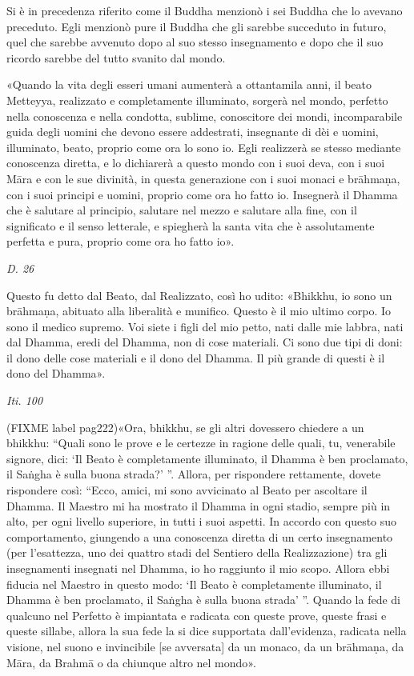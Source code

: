  Si è in precedenza riferito come il Buddha menzionò i
sei Buddha che lo avevano preceduto. Egli menzionò pure il Buddha che
gli sarebbe succeduto in futuro, quel che sarebbe avvenuto dopo al suo
stesso insegnamento e dopo che il suo ricordo sarebbe del tutto svanito
dal mondo.


 «Quando la vita degli esseri umani aumenterà a ottantamila
anni, il beato Metteyya, realizzato e completamente illuminato, sorgerà
nel mondo, perfetto nella conoscenza e nella condotta, sublime,
conoscitore dei mondi, incomparabile guida degli uomini che devono
essere addestrati, insegnante di dèi e uomini, illuminato, beato,
proprio come ora lo sono io. Egli realizzerà se stesso mediante
conoscenza diretta, e lo dichiarerà a questo mondo con i suoi deva, con
i suoi Māra e con le sue divinità, in questa generazione con i suoi
monaci e brāhmaṇa, con i suoi principi e uomini, proprio come ora ho
fatto io. Insegnerà il Dhamma che è salutare al principio, salutare nel
mezzo e salutare alla fine, con il significato e il senso letterale, e
spiegherà la santa vita che è assolutamente perfetta e pura, proprio
come ora ho fatto io».


\emph{D. 26}


Questo fu detto dal Beato, dal Realizzato, così ho udito: «Bhikkhu, io
sono un brāhmaṇa, abituato alla liberalità e munifico. Questo è il mio
ultimo corpo. Io sono il medico supremo. Voi siete i figli del mio
petto, nati dalle mie labbra, nati dal Dhamma, eredi del Dhamma, non di
cose materiali. Ci sono due tipi di doni: il dono delle cose materiali e
il dono del Dhamma. Il più grande di questi è il dono del Dhamma».


\emph{Iti. 100}


(FIXME label pag222)«Ora, bhikkhu, se gli altri dovessero chiedere a un bhikkhu: “Quali sono
le prove e le certezze in ragione delle quali, tu, venerabile signore,
dici: ‘Il Beato è completamente illuminato, il Dhamma è ben proclamato,
il Saṅgha è sulla buona strada?’ ”. Allora, per rispondere rettamente,
dovete rispondere così: “Ecco, amici, mi sono avvicinato al Beato per
ascoltare il Dhamma. Il Maestro mi ha mostrato il Dhamma in ogni stadio,
sempre più in alto, per ogni livello superiore, in tutti i suoi aspetti.
In accordo con questo suo comportamento, giungendo a una conoscenza
diretta di un certo insegnamento (per l’esattezza, uno dei quattro stadi
del Sentiero della Realizzazione) tra gli insegnamenti insegnati nel
Dhamma, io ho raggiunto il mio scopo. Allora ebbi fiducia nel Maestro in
questo modo: ‘Il Beato è completamente illuminato, il Dhamma è ben
proclamato, il Saṅgha è sulla buona strada’ ”. Quando la fede di
qualcuno nel Perfetto è impiantata e radicata con queste prove, queste
frasi e queste sillabe, allora la sua fede la si dice supportata
dall’evidenza, radicata nella visione, nel suono e invincibile [se
avversata] da un monaco, da un brāhmaṇa, da Māra, da Brahmā o da
chiunque altro nel mondo».


